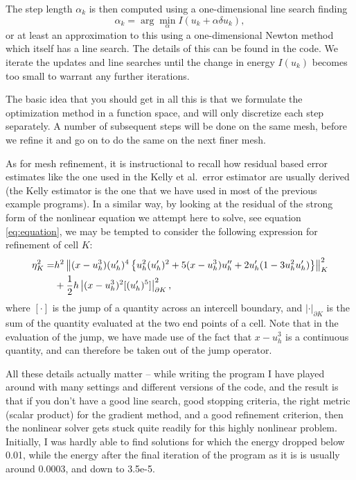\documentclass{article}
\begin{document}
The step length $\alpha_k$ is then computed using a one-dimensional line search
finding
\begin{equation}
  \label{eq:linesearch}
  \alpha_k = \arg\min_\alpha I(u_k+\alpha\delta u_k),
\end{equation}
or at least an approximation to this using a one-dimensional Newton method
which itself has a line search. The details of this can be found in the code.
We iterate the updates and line searches until the change in energy $I(u_k)$
becomes too small to warrant any further iterations.

The basic idea that you should get in all this is that we formulate the
optimization method in a function space, and will only discretize each step
separately. A number of subsequent steps will be done on the same mesh, before
we refine it and go on to do the same on the next finer mesh.

As for mesh refinement, it is instructional to recall how residual based error
estimates like the one used in the Kelly et al.~error estimator are usually
derived (the Kelly estimator is the one that we have used in most of the
previous example programs). In a similar way, by looking at the residual of
the strong form of the nonlinear equation we attempt here to solve, see
equation \eqref{eq:equation}, we may be tempted to consider the following
expression for refinement of cell $K$:
\begin{eqnarray}
  \label{eq:error-estimate}
  \eta_K^2 =&
  h^2 \left\|
    (x-u_h^3) (u_h')^4 \left\{ u_h^2 (u_h')^2 + 5(x-u_h^3)u_h'' + 2u_h'(1-3u_h^2u_h') \right\}
  \right\|^2_K
  \notag \\
  & +
  \frac 12 h \left| (x-u_h^3)^2 [(u_h')^5] \right|^2_{\partial K},
\end{eqnarray}
where $[\cdot]$ is the jump of a quantity across an intercell boundary, and 
$|\cdot|_{\partial K}$ is the sum of the quantity evaluated at the two end
points of a cell. Note that in the evaluation of the jump, we have made use of
the fact that $x-u_h^3$ is a continuous quantity, and can therefore be taken
out of the jump operator.

All these details actually matter -- while writing the program I have played
around with many settings and different versions of the code, and the result
is that if you don't have a good line search, good stopping criteria, the
right metric (scalar product) for the gradient method, and a good refinement
criterion, then the nonlinear solver gets stuck quite readily for this highly
nonlinear problem. Initially, I was hardly able to find solutions for which
the energy dropped below 0.01, while the energy after the final iteration of
the program as it is is usually around 0.0003, and down to 3.5e-5.
\end{document}
